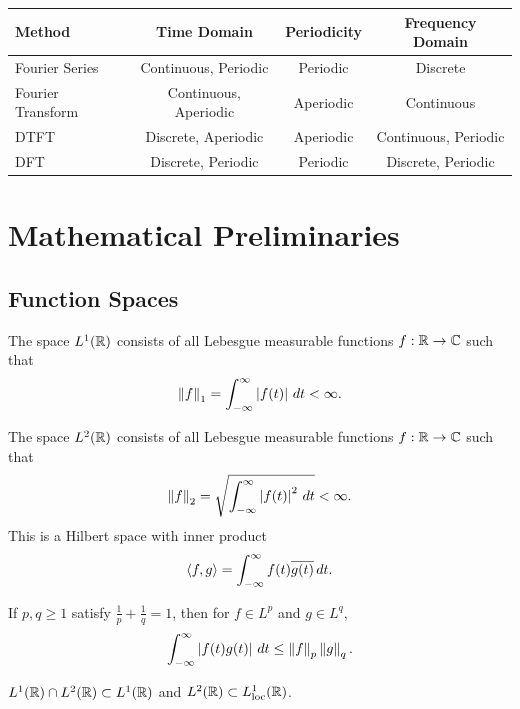 \begin{notechapter}
\begin{center}
\begin{tabular}{|l|c|c|c|}
\hline
\textbf{Method} & \textbf{Time Domain} & \textbf{Periodicity} & \textbf{Frequency Domain} \\
\hline
Fourier Series & Continuous, Periodic & Periodic & Discrete \\
Fourier Transform & Continuous, Aperiodic & Aperiodic & Continuous \\
DTFT & Discrete, Aperiodic & Aperiodic & Continuous, Periodic \\
DFT & Discrete, Periodic & Periodic & Discrete, Periodic \\
\hline
\end{tabular}
\end{center}

\section{Mathematical Preliminaries}

\subsection{Function Spaces}

\begin{definition}[$L^1$ Space]
The space $L^1(\mathbb{R})$ consists of all Lebesgue measurable functions $f:\mathbb{R} \to \mathbb{C}$ such that
\[
\left\|f\right\|_1 = \int_{-\infty}^{\infty} \left|f(t)\right| \, dt < \infty.
\]
\end{definition}

\begin{definition}[$L^2$ Space]
The space $L^2(\mathbb{R})$ consists of all Lebesgue measurable functions $f:\mathbb{R} \to \mathbb{C}$ such that
\[
\left\|f\right\|_2 = \sqrt{\int_{-\infty}^{\infty} \left|f(t)\right|^2 \, dt} < \infty.
\]
This is a Hilbert space with inner product
\[
\left\langle f, g \right\rangle = \int_{-\infty}^{\infty} f(t) \overline{g(t)} \, dt.
\]
\end{definition}

\begin{theorem}
If $p, q \geq 1$ satisfy $\frac{1}{p} + \frac{1}{q} = 1$, then for $f \in L^p$ and $g \in L^q$,
\[
\int_{-\infty}^{\infty} \left|f(t)g(t)\right| \, dt \leq \left\|f\right\|_p \left\|g\right\|_q.
\]
\end{theorem}

\begin{corollary}
$L^1(\mathbb{R}) \cap L^2(\mathbb{R}) \subset L^1(\mathbb{R})$ and $L^2(\mathbb{R}) \subset L^1_{\text{loc}}(\mathbb{R})$.
\end{corollary}


\end{notechapter}
